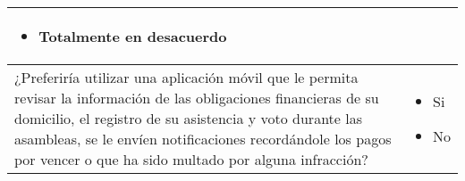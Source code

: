 \begin{center}
\begin{small}
\begin{longtable}[c]{|p{}|p{}|}
\begin{itemize}
				\item Totalmente en desacuerdo
			\end{itemize} \\
			\hline
			¿Preferiría utilizar una aplicación móvil que le permita revisar la información de las obligaciones financieras de su domicilio, el registro de su asistencia y voto durante las asambleas, se le envíen notificaciones recordándole los pagos por vencer o que ha sido multado por alguna infracción? &
			\begin{itemize}
				\item Si
				\item No
			\end{itemize} \\
			\hline
		\end{longtable}
	\end{small}
\end{center}
